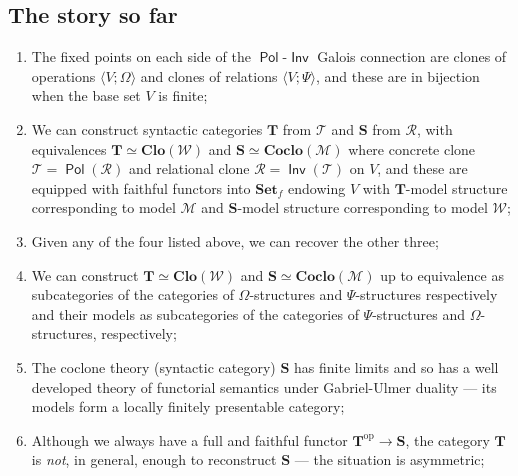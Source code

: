 \documentclass[11pt, a4paper, twoside,leqno]{amsart}
\newcommand{\cat}[1]{\mathbf{#1}}
\numberwithin{equation}{section}
\theoremstyle{plain}
\theoremstyle{definition}
\DeclareMathOperator{\Pol}{\mathsf{Pol}}
\DeclareMathOperator{\Inv}{\mathsf{Inv}}
\begin{document}
\subsection{The story so far}
\label{sec:story-so-far}

\begin{enumerate}[label=(\alph*), ref=(\alph*)]
\item
  \label{it:pol-inv-bij}
  The fixed points on each side of the \(\Pol\)-\(\Inv\) Galois
  connection are clones of operations \(\langle V; \Omega 
  \rangle \) and clones of relations \(\langle V; \Psi \rangle\),
  and these are in bijection when the base set \(V\) is finite;
  
\item
  \label{it:pol-inv-syntactic-cats}
  We can construct syntactic categories \(\cat{T}\) from \(\mathscr{T}
  \) and \(\cat{S}\) from \(\mathscr{R}\), with equivalences \(\cat{T} \simeq \cat{Clo}
  (\mathcal{W})\) and \(\cat{S} \simeq \cat{Coclo}(\mathcal{M})\)
  where concrete clone \(\mathscr{T} = \Pol(\mathscr{R}
  )
  \) and
  relational clone \(\mathscr{R}= \Inv(\mathscr{T}
  )\) on \(V\), and these are equipped with faithful functors into
  \(\cat{Set}_{f}\) endowing \(V\) with \(\cat{T}\)-model structure
  corresponding to model \(\mathcal{M}\) and
  \(\cat{S}\)-model structure corresponding to model \(\mathcal{W}\);
  
\item
  \label{it:pol-inv-syntax-4}
  Given any of the four listed above, we can recover the other
  three;
  
\item
  \label{it:pol-inv-sig-method}
  We can construct \(\cat{T} \simeq \cat{Clo}
  (\mathcal{W})\) and \(\cat{S} \simeq \cat{Coclo}(\mathcal{M})\) up to equivalence as
  subcategories of 
  the categories of \(\Omega\)-structures and
  \(\Psi\)-structures respectively and their models as subcategories of 
  the categories of \(\Psi\)-structures and
  \(\Omega\)-structures, respectively;
  
\item
  \label{it:models-lfp}
  The coclone theory (syntactic category) \(\cat{S}\)
  has finite limits and
  so has a well developed theory of functorial semantics under
  Gabriel-Ulmer duality --- its models form a
  locally finitely presentable category;

\item
  \label{it:T-not-enough}
  Although we always have a full and faithful functor
  \(\cat{T}^{\mathrm{op}} \rightarrow \cat{S}\), the category
  \(\cat{T}\) is \emph{not}, in general, enough to reconstruct
  \(\cat{S}\) --- the situation is asymmetric;
\end{enumerate}
\end{document}
